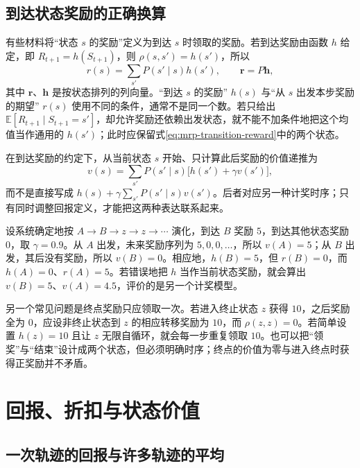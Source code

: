 \documentclass[UTF8,12pt,a4paper,fontset=fandol]{ctexart}
\begin{document}
\subsection{到达状态奖励的正确换算}

有些材料将“状态 $s$ 的奖励”定义为到达 $s$ 时领取的奖励。若到达奖励由函数 $h$ 给定，即 $R_{t+1}=h(S_{t+1})$，则 $\rho(s,s')=h(s')$，所以
\begin{equation}
  r(s)=\sum_{s'}P(s'\mid s)h(s'),\qquad
  \boldsymbol r=P\boldsymbol h,
  \label{eq:mrp-arrival-reward}
\end{equation}
其中 $\boldsymbol r$、$\boldsymbol h$ 是按状态排列的列向量。“到达 $s$ 的奖励” $h(s)$ 与“从 $s$ 出发本步奖励的期望” $r(s)$ 使用不同的条件，通常不是同一个数。若只给出 $\mathbb E[R_{t+1}\mid S_{t+1}=s']$，却允许奖励还依赖出发状态，就不能不加条件地把这个均值当作通用的 $h(s')$；此时应保留式\eqref{eq:mrp-transition-reward}中的两个状态。

在到达奖励的约定下，从当前状态 $s$ 开始、只计算此后奖励的价值递推为
\begin{equation}
  v(s)=\sum_{s'}P(s'\mid s)\bigl[h(s')+\gamma v(s')\bigr],
  \label{eq:mrp-arrival-bellman}
\end{equation}
而不是直接写成 $h(s)+\gamma\sum_{s'}P(s'\mid s)v(s')$。后者对应另一种计奖时序；只有同时调整回报定义，才能把这两种表达联系起来。

\begin{example}[混用奖励约定会使结果错一拍]
\label{ex:mrp-arrival}
设系统确定地按 $A\to B\to z\to z\to\cdots$ 演化，到达 $B$ 奖励 $5$，到达其他状态奖励 $0$，取 $\gamma=0.9$。从 $A$ 出发，未来奖励序列为 $5,0,0,\ldots$，所以 $v(A)=5$；从 $B$ 出发，其后没有奖励，所以 $v(B)=0$。相应地，$h(B)=5$，但 $r(B)=0$，而 $h(A)=0$、$r(A)=5$。若错误地把 $h$ 当作当前状态奖励，就会算出 $v(B)=5$、$v(A)=4.5$，评价的是另一个计奖模型。
\end{example}

另一个常见问题是终点奖励只应领取一次。若进入终止状态 $z$ 获得 $10$，之后奖励全为 $0$，应设非终止状态到 $z$ 的相应转移奖励为 $10$，而 $\rho(z,z)=0$。若简单设置 $h(z)=10$ 且让 $z$ 无限自循环，就会每一步重复领取 $10$。也可以把“领奖”与“结束”设计成两个状态，但必须明确时序；终点的价值为零与进入终点时获得正奖励并不矛盾。

\section{回报、折扣与状态价值}
\label{sec:mrp-return}

\subsection{一次轨迹的回报与许多轨迹的平均}
\end{document}
